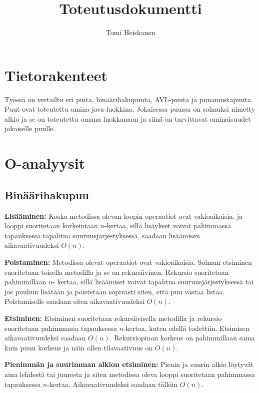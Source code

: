 \documentclass[12pt,a4paper,leqno,titlepage,twoside]{article}
\begin{document}
\title{Toteutusdokumentti}
\author{Tomi Heiskanen}
\maketitle

\newpage
\section*{Tietorakenteet}

Työssä on vertailtu eri puita, binäärihakupuuta, AVL-puuta ja punamustapuuta.
Puut ovat toteutettu omina java-luokkina. Jokaisessa puussa on solmuksi
nimetty alkio ja se on toteutettu omana luokkanaan ja siinä on tarvittavat
ominaisuudet jokaiselle puulle.

\section*{O-analyysit}

\subsection*{Binäärihakupuu}

\begin{description}
\item{\textbf{Lisääminen:}} Koska metodissa olevan loopin operaatiot ovat vakioaikaisia.
ja looppi suoritetaan korkeintaan $n$-kertaa, sillä lisäykset voivat pahimmassa
tapauksessa tapahtua suuruusjärjestyksessä, saadaan lisäämisen aikavaativuudeksi
$O(n)$.

\item{\textbf{Poistaminen:}} Metodissa olevat operaatiot ovat vakioaikaisia. Solmun
etsiminen suoritetaan toisella metodilla ja se on rekursiivinen. Rekursio
suoritetaan pahimmillaan $n$- kertaa, sillä lisäämiset voivat tapahtua suuruusjärjestyksessä
tai jos puuhun lisätään ja poistetaan sopivasti siten, että puu vastaa listaa.
Poistamiselle saadaan siten aikavaativuudeksi $O(n)$.

\item{\textbf{Etsiminen:}} Etsiminen suoritetaan rekursiivisella metodilla ja
rekursio suoritetaan pahimmassa tapauksessa $n$-kertaa, kuten edellä todettiin.
Etsimisen aikavaativuudeksi saadaan $O(n)$. Rekursiopinon korkeus on pahimmillaan
sama kuin puun korkeus ja näin ollen tilavaativuus on $O(n)$.

\item{\textbf{Pienimmän ja suurimman alkion etsiminen:}} Pienin ja suurin alkio
löytyvät aina lehdestä tai juuresta ja siten metodissa oleva looppi suoritetaan
pahimmassa tapauksessa $n$-kertaa. Aikavaativuudeksi saadaan tällöin $O(n)$.
\end{description}
\end{document}
